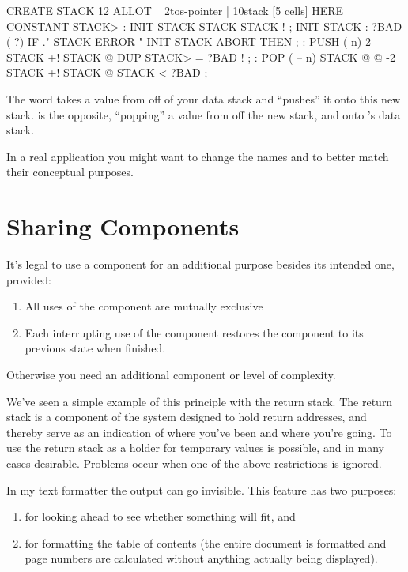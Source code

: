 \begin{Code}
CREATE STACK  12 ALLOT  \  { 2tos-pointer | 10stack [5 cells] }
HERE CONSTANT STACK>
: INIT-STACK   STACK STACK ! ;   INIT-STACK
: ?BAD  ( ?)   IF ." STACK ERROR "  INIT-STACK  ABORT  THEN ;
: PUSH  ( n)   2 STACK +!  STACK @  DUP  STACK> = ?BAD  ! ;
: POP  ( -- n)  STACK @ @  -2 STACK +!  STACK @ STACK < ?BAD ;
\end{Code}
The word  takes a value from off of your data stack and
``pushes'' it onto this new stack.  is the opposite,
``popping'' a value from off the new stack, and onto \Forth{}'s data
stack.

In a real application you might want to change the names 
and  to better match their conceptual purposes.

\section{Sharing Components}%
%
\begin{tip}
It's legal to use a component for an additional purpose besides its
intended one, provided:
\medskip
\begin{enumerate}
\item All uses of the component are mutually exclusive
\item Each interrupting use of the component restores the component to
   its previous state when finished.
\end{enumerate}
\medskip\noindent
Otherwise you need an additional component or level of complexity.
\end{tip}%
We've seen a simple example of this principle with the return stack. The
return stack is a component of the \Forth{} system designed to hold return
addresses, and thereby serve as an indication of where you've been and
where you're going. To use the return stack as a holder for temporary
values is possible, and in many cases desirable. Problems occur when one
of the above restrictions is ignored.%

In my text formatter the output can go invisible. This feature has
two purposes: 
\begin{enumerate}
\item for looking ahead to see whether something will fit, and
\item for formatting the table of contents (the entire document is
formatted and page numbers are calculated without anything actually being
displayed).
\end{enumerate}

